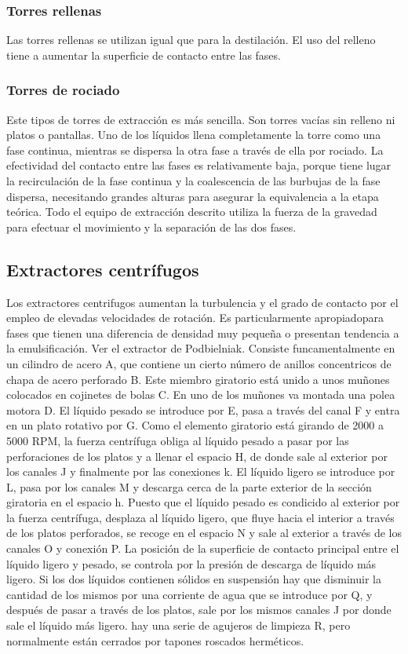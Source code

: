 \documentclass[12pt,openany]{book}
\begin{document}
\subsubsection{Torres rellenas}
Las torres rellenas se utilizan igual que para la destilación. El uso del relleno tiene a aumentar la superficie de contacto entre las fases.
\subsubsection{Torres de rociado}
Este tipos de torres de extracción es más sencilla. Son torres vacías sin relleno ni platos o pantallas. Uno de los líquidos llena completamente 
la torre como una fase continua, mientras se dispersa la otra fase a través de ella por rociado. La efectividad del contacto entre las fases es relativamente baja, 
porque tiene lugar la recirculación de la fase continua y la coalescencia de las burbujas de la fase dispersa, necesitando grandes alturas para asegurar 
la equivalencia a la etapa teórica.
Todo el equipo de extracción descrito utiliza la fuerza de la gravedad para efectuar el movimiento y la separación de las dos fases.

\subsection {Extractores centrífugos}

Los extractores centrifugos aumentan la turbulencia y el grado de contacto por el empleo de elevadas velocidades de rotación. Es particularmente 
apropiadopara fases que tienen una diferencia de densidad muy pequeña o presentan tendencia a la emulsificación. Ver el extractor de Podbielniak.
Consiste funcamentalmente en un cilindro de acero A, que contiene un cierto número de anillos concentricos de chapa de acero perforado B.
Este miembro giratorio está unido a unos muñones colocados en cojinetes de bolas C. En uno de los muñones va montada una polea motora D. El líquido 
pesado se introduce por E, pasa a través del canal F y entra en un plato rotativo por G. Como el elemento giratorio está girando de 2000 a 5000 RPM, la 
fuerza centrífuga obliga al líquido pesado a pasar por las perforaciones de los platos y a llenar el espacio H, de donde sale al exterior por los canales J y
 finalmente por las conexiones k. El líquido ligero se introduce por L, pasa por los canales M y descarga cerca de la parte exterior de la 
 sección giratoria en el espacio h. Puesto que el líquido pesado es condicido al exterior por la fuerza centrífuga, desplaza al líquido ligero,
 que fluye hacia el interior a través de los platos perforados, se recoge en el espacio N y sale al exterior a través de los canales O y conexión P.
 La posición de la superficie de contacto principal entre el líquido ligero y pesado, se controla por la presión de descarga de líquido más ligero. 
 Si los dos líquidos contienen sólidos en suspensión hay que disminuir la cantidad de los mismos por una corriente de agua que se introduce 
 por Q, y después de pasar a través de los platos, sale por los mismos canales J por donde sale el líquido más ligero. hay una serie de agujeros 
 de limpieza R, pero normalmente están cerrados por tapones roscados herméticos. 
\end{document}
